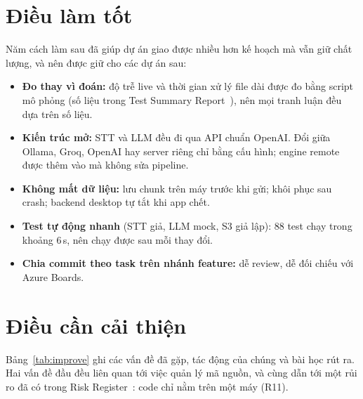 \documentclass[12pt,a4paper]{report}
\begin{document}
\section{Điều làm tốt}

Năm cách làm sau đã giúp dự án giao được nhiều hơn kế hoạch mà vẫn giữ chất lượng, và nên được giữ cho các dự án
sau:
\begin{itemize}
  \item \textbf{Đo thay vì đoán:} độ trễ live và thời gian xử lý file dài được đo bằng script mô phỏng (số liệu trong
        Test Summary Report~\cite{qtd}), nên mọi tranh luận đều dựa trên số liệu.
  \item \textbf{Kiến trúc mở:} STT và LLM đều đi qua API chuẩn OpenAI. Đổi giữa Ollama, Groq, OpenAI hay server riêng
        chỉ bằng cấu hình; engine remote được thêm vào mà không sửa pipeline.
  \item \textbf{Không mất dữ liệu:} lưu chunk trên máy trước khi gửi; khôi phục sau crash; backend desktop tự tắt khi
        app chết.
  \item \textbf{Test tự động nhanh} (STT giả, LLM mock, S3 giả lập): 88 test chạy trong khoảng 6\,s, nên chạy được
        sau mỗi thay đổi.
  \item \textbf{Chia commit theo task trên nhánh feature:} dễ review, dễ đối chiếu với Azure Boards.
\end{itemize}

\section{Điều cần cải thiện}

Bảng~\ref{tab:improve} ghi các vấn đề đã gặp, tác động của chúng và bài học rút ra. Hai vấn đề đầu đều liên quan tới
việc quản lý mã nguồn, và cùng dẫn tới một rủi ro đã có trong Risk Register~\cite{pmp}: code chỉ nằm trên một máy
(R11).
\end{document}
